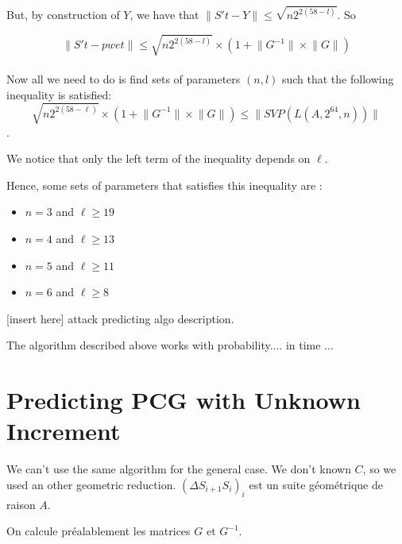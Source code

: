 \documentclass[preprint]{iacrtrans}
\begin{document}
But, by construction of \(Y\), we have that \(\lVert S't - Y \rVert \leqslant \sqrt{n2^{2(58-l)}} \). So

\[ \lVert S't - pwet \rVert \leqslant \sqrt{n2^{2(58-l)}}\times (1 +\lVert G^{-1} \rVert  \times \lVert G\rVert )\]\\




Now all we need to do is find sets of parameters \((n,l)\) such that the following inequality is satisfied: 
\[\sqrt{n2^{2(58-\ell)}} \times (1 +\lVert G^{-1} \rVert  \times \lVert G\rVert) \leqslant \lVert SVP(L(A,2^{64},n))\rVert \].

We notice that only the left term of the inequality depends on \(\ell\).

Hence, some sets of parameters that satisfies this inequality are :
\begin{itemize}
	\item \(n = 3\) and \(\ell \geqslant 19\)
	\item \(n = 4\) and \(\ell \geqslant 13\)
	\item \(n = 5\) and \(\ell \geqslant 11\)
	\item \(n = 6\) and \(\ell \geqslant 8\)
\end{itemize}

[insert here] attack predicting algo description.

\begin{theorem}
  The algorithm described above works with probability.... in time ...
\end{theorem}

\section{Predicting PCG with Unknown Increment}
We can't use the same algorithm for the general case. We don't known $C$, so we used an other geometric reduction.
$(\Delta S_{i+1}S_i)_i$ est un suite géométrique de raison $A$.

On calcule préalablement les matrices $G$ et $G^{-1}$.
\end{document}
